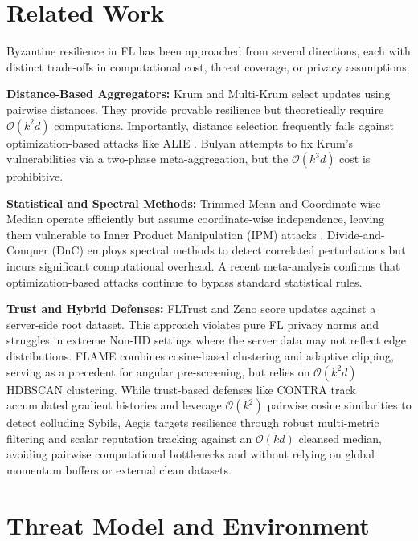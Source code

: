 \documentclass[10pt, conference]{IEEEtran}
\begin{document}
\section{Related Work}
Byzantine resilience in FL has been approached from several directions, each with distinct trade-offs in computational cost, threat coverage, or privacy assumptions.

\textbf{Distance-Based Aggregators:} Krum and Multi-Krum \cite{blanchard2017} select updates using pairwise distances. They provide provable resilience but theoretically require $\mathcal{O}(k^2 d)$ computations. Importantly, distance selection frequently fails against optimization-based attacks like ALIE \cite{baruch2019}. Bulyan \cite{elmhamdi2018} attempts to fix Krum's vulnerabilities via a two-phase meta-aggregation, but the $\mathcal{O}(k^3 d)$ cost is prohibitive.

\textbf{Statistical and Spectral Methods:} Trimmed Mean and Coordinate-wise Median \cite{yin2018} operate efficiently but assume coordinate-wise independence, leaving them vulnerable to Inner Product Manipulation (IPM) attacks \cite{xie2020ipm}. Divide-and-Conquer (DnC) \cite{shejwalkar2021} employs spectral methods to detect correlated perturbations but incurs significant computational overhead. A recent meta-analysis \cite{allouah2025} confirms that optimization-based attacks continue to bypass standard statistical rules.

\textbf{Trust and Hybrid Defenses:} FLTrust \cite{cao2021} and Zeno \cite{xie2019zeno} score updates against a server-side root dataset. This approach violates pure FL privacy norms and struggles in extreme Non-IID settings where the server data may not reflect edge distributions. FLAME \cite{nguyen2022} combines cosine-based clustering and adaptive clipping, serving as a precedent for angular pre-screening, but relies on $\mathcal{O}(k^2 d)$ HDBSCAN clustering. While trust-based defenses like CONTRA \cite{awan2021contra} track accumulated gradient histories and leverage $\mathcal{O}(k^2)$ pairwise cosine similarities to detect colluding Sybils, Aegis targets resilience through robust multi-metric filtering and scalar reputation tracking against an $\mathcal{O}(kd)$ cleansed median, avoiding pairwise computational bottlenecks and without relying on global momentum buffers or external clean datasets.

\section{Threat Model and Environment}
\end{document}
